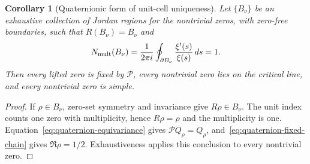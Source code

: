 \documentclass[11pt]{amsart}
\newtheorem{corollary}[theorem]{Corollary}
\theoremstyle{definition}
\theoremstyle{remark}
\begin{document}
\begin{corollary}[Quaternionic form of unit-cell uniqueness]
\label{cor:quaternion-unit-cell}
Let $\{B_\nu\}$ be an exhaustive collection of Jordan regions for the nontrivial zeros, with
zero-free boundaries, such that $R(B_\nu)=B_\nu$ and
\begin{equation}\label{eq:quaternion-unit-index}
 N_{\rm mult}(B_\nu)
 =\frac{1}{2\pi i}\oint_{\partial B_\nu}
   \frac{\xi'(s)}{\xi(s)}\,ds=1.
\end{equation}
Then every lifted zero is fixed by $\mathcal P$, every nontrivial zero lies on the critical
line, and every nontrivial zero is simple.
\end{corollary}
\begin{proof}
If $\rho\in B_\nu$, zero-set symmetry and invariance give $R\rho\in B_\nu$.  The unit index
counts one zero with multiplicity, hence $R\rho=\rho$ and the multiplicity is one.
Equation~\eqref{eq:quaternion-equivariance} gives
$\mathcal P Q_\rho=Q_\rho$, and~\eqref{eq:quaternion-fixed-chain} gives
$\Re\rho=1/2$.  Exhaustiveness applies this conclusion to every nontrivial zero.
\end{proof}
\end{document}
